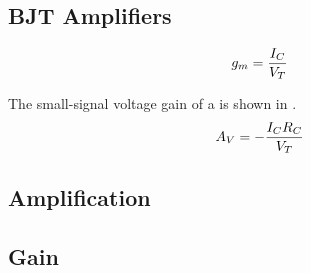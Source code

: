 \subsection{BJT Amplifiers}\label{subsec:BJT_Amps}
\begin{equation}\label{eq:BJT-Transconductance_Gain}
  \TransconductanceGain = \frac{\DCCurrent{\Collector}}{\ThermalVoltage}
\end{equation}

The small-signal voltage gain of a  is shown in .
\begin{equation}\label{eq:BJT-Small_Signal_Voltage_Gain}
  \Amp{V} = - \frac{\DCCurrent{\Collector} R_{\Collector}}{\ThermalVoltage}
\end{equation}

\subsection{Amplification}\label{subsec:Amplification}

\subsection{Gain}\label{subsec:Gain}

